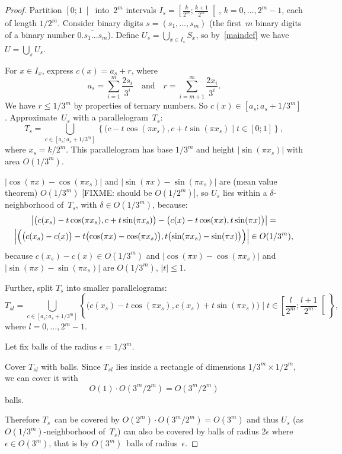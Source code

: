 \documentclass[oneside,draft]{amsart}
\newcommand{\setcond}[2]{\left\{#1\mid#2\right\}}
\begin{document}
\begin{proof}

Partition $\left[0;1\right[$ into~$2^m$ intervals $I_s=\left[\frac{k}{2^m};\frac{k+1}{2^m}\right[$, $k=0,\ldots,2^m-1$, each of length $1/2^m$. Consider binary digits $s=(s_1,\ldots,s_m)$ (the first~$m$ binary digits of a binary number $\overline{0.s_1\dots s_m}$). Define $U_s=\bigcup_{x\in I_s} S_x$, so by~\eqref{maindef} we have $U=\bigcup_s U_s$.

For $x\in I_x$, express $c(x)=a_s+r$, where \[a_s=\sum_{i=1}^m \frac{2s_i}{3^i} \quad\text{and}\quad r=\sum_{i=m+1}^\infty \frac{2x_i}{3^i}.\] We have $r\leq 1/3^m$ by properties of ternary numbers.
So $c(x)\in[a_s;a_s+1/3^m]$. Approximate~$U_s$ with a parallelogram~$T_s$:
\[
T_s = \bigcup_{c\in[a_s;a_s+1/3^m]} \setcond{(c-t\cos(\pi x_s), c+t\sin(\pi x_s)}{t\in[0;1]},
\]
where $x_s=k/2^m$. This parallelogram has base $1/3^m$ and height $\lvert\sin(\pi x_s)\rvert$ with area $O(1/3^m)$.

$\lvert\cos(\pi x)-\cos(\pi x_s)\rvert$ and $\lvert\sin(\pi x)-\sin(\pi x_s)\rvert$ are (mean value theorem) $O(1/3^m)$ [FIXME: should be $O(1/2^m)$], so $U_s$ lies within a $\delta$-neigh\-bor\-hood of~$T_s$, with $\delta\in O(1/3^m)$, because:
\begin{multline*}
\left\lvert\bigl(c(x_s)-t\cos(\pi x_s), c+t\sin(\pi x_s)\bigr) - \bigl(c(x)-t\cos(\pi x), t\sin(\pi x)\bigr)\right\rvert=\\
\left\lvert\Bigl(\bigl(c(x_s)-c(x)\bigr)-t\bigl(\cos(\pi x)-\cos(\pi x_s)\bigr), t\bigl(\sin(\pi x_s)-\sin(\pi x)\bigr)\Bigr)\right\rvert\in O(1/3^m),
\end{multline*}
because $c(x_s)-c(x)\in O(1/3^m)$ and $\lvert\cos(\pi x)-\cos(\pi x_s)\rvert$ and $\lvert\sin(\pi x)-\sin(\pi x_s)\rvert$ are $O(1/3^m)$,
$\lvert t\rvert\leq 1$.

Further, split $T_s$ into smaller parallelograms:
\[
T_{sl} = \bigcup_{c\in[a_s;a_s+1/3^m]} \setcond{\bigl(c(x_s)-t\cos(\pi x_s), c(x_s)+t\sin(\pi x_s)\bigr)}{t\in\left[\frac{l}{2^m};\frac{l+1}{2^m}\right[},
\]
where $l=0,\ldots,2^m-1$.

Let fix balls of the radius $\epsilon = 1/3^m$.

Cover $T_{sl}$ with balls.
Since $T_{sl}$ lies inside a rectangle of dimensions \( 1/3^m \times 1/2^m \), we can cover it with
\[
O(1) \cdot O(3^m / 2^m) = O(3^m / 2^m)
\]
balls.

Therefore $T_s$~can be covered by $O(2^m)\cdot O(3^m / 2^m) = O(3^m)$ and thus $U_s$ (as $O(1/3^m)$-neigh\-bor\-hood of~$T_s$) can also be covered by balls of radius $2\epsilon$ where $\epsilon\in O(3^m)$, that is by $O(3^m)$~balls of radius~$\epsilon$.


\end{proof}
\end{document}
